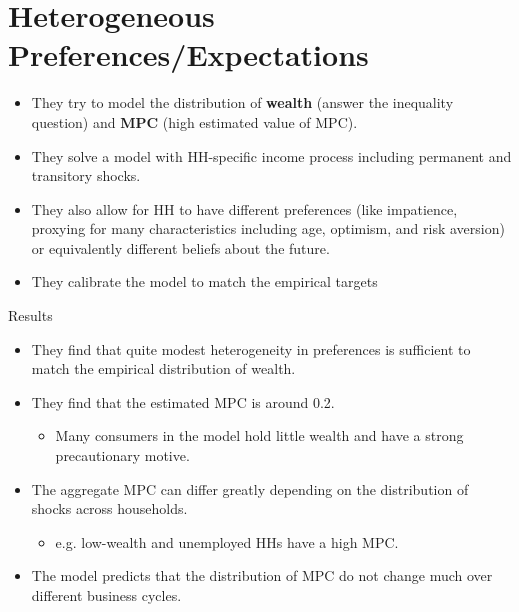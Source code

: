 \documentclass{beamer}
\begin{document}
\section{Heterogeneous Preferences/Expectations}
\begin{frame}{\cite{carroll2017distribution}}
	\begin{itemize}
		\item<1-> They try to model the distribution of \textbf{wealth} (answer the inequality question) and \textbf{MPC} (high estimated value of MPC).
		\item <2-> They solve a model with HH-specific income process including permanent and transitory shocks.
		\item <3-> They also allow for HH to have different preferences (like impatience, proxying for many characteristics including age, optimism, and risk aversion) or equivalently different beliefs about the future.
		\item<4->[] They calibrate the model to match the empirical targets
	\end{itemize}
\end{frame}
\begin{frame}{Results}{\citep{carroll2017distribution}}
	\begin{itemize}
		\item <1-> They find that quite modest heterogeneity in preferences is sufficient to match the empirical distribution of wealth.
		\item <2-> They find that the estimated MPC is around 0.2.
		\begin{itemize}
			\item <2-> Many consumers in the model hold little wealth and have a strong precautionary motive.
		\end{itemize}
		\item <3-> The aggregate MPC can differ greatly depending on the distribution of shocks across households.
		\begin{itemize}
			\item <3-> e.g. low-wealth and unemployed HHs have a high MPC.
		\end{itemize}
		\item <4-> The model predicts that the distribution of MPC do not change much over different business cycles.
	\end{itemize}
\end{frame}
\end{document}
